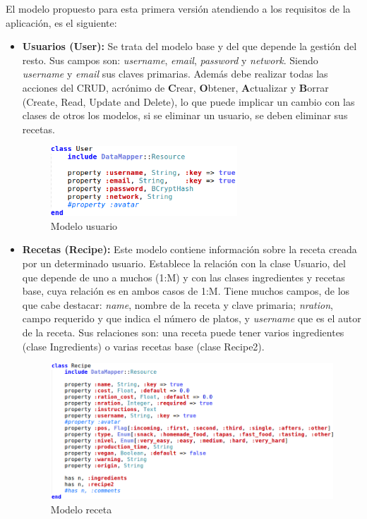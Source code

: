 El modelo propuesto para esta primera versión atendiendo a los requisitos de la aplicación, es el siguiente:
\begin{itemize}
	\item \textbf{Usuarios (User):} Se trata del modelo base y del que depende la gestión del resto. Sus campos son: \emph{username}, \emph{email}, \emph{password} y \emph{network}. Siendo \emph{username} y \emph{email} sus claves primarias. Además debe realizar todas las acciones del CRUD, acrónimo de \textbf{C}rear, \textbf{O}btener, \textbf{A}ctualizar y \textbf{B}orrar (Create, Read, Update and Delete), lo que puede implicar un cambio con las clases de otros los modelos, si se eliminar un usuario, se deben eliminar sus recetas.

	\begin{figure}[H]
		\centering
		\includegraphics[width=7cm]{./images/chefmanagement-model-user.png}
		\caption{Modelo usuario} \label{fig:chefmanagement-model-user}
	\end{figure}

	\item \textbf{Recetas (Recipe):} Este modelo contiene información sobre la receta creada por un determinado usuario. Establece la relación con la clase Usuario, del que depende de uno a muchos (1:M) y con las clases ingredientes y recetas base, cuya relación es en ambos casos de 1:M. Tiene muchos campos, de los que cabe destacar: \emph{name}, nombre de la receta y clave primaria; \emph{nration}, campo requerido y que indica el número de platos, y \emph{username} que es el autor de la receta. 	Sus relaciones son: una receta puede tener varios ingredientes (clase Ingredients) o varias recetas base (clase Recipe2).

	\begin{figure}[H]
		\centering
		\includegraphics[width=12cm]{./images/chefmanagement-model-recipe.png}
		\caption{Modelo receta} \label{fig:chefmanagement-model-recipe}
	\end{figure}


\end{itemize}
